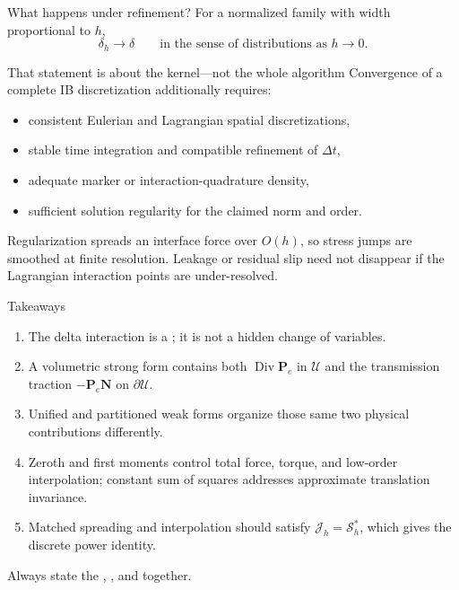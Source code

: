 \documentclass[aspectratio=169,11pt]{beamer}
\newcommand{\Pten}{\bm{P}_{e}}
\newcommand{\Nvec}{\bm{N}}
\begin{document}
\begin{frame}{What happens under refinement?}
For a normalized family with width proportional to \(h\),
\[
  \delta_h\longrightarrow\delta
  \qquad\text{in the sense of distributions as }h\to0.
\]

\begin{block}{That statement is about the kernel---not the whole algorithm}
Convergence of a complete IB discretization additionally requires:
\begin{itemize}
  \item consistent Eulerian and Lagrangian spatial discretizations,
  \item stable time integration and compatible refinement of \(\Delta t\),
  \item adequate marker or interaction-quadrature density,
  \item sufficient solution regularity for the claimed norm and order.
\end{itemize}
\end{block}

\begin{punchbox}
Regularization spreads an interface force over \(O(h)\), so stress jumps are smoothed at finite resolution. Leakage or residual slip need not disappear if the Lagrangian interaction points are under-resolved.
\end{punchbox}
\end{frame}

\begin{frame}{Takeaways}
\begin{enumerate}
  \item The delta interaction is a ; it is not a hidden change of variables.
  \item A volumetric strong form contains both \(\operatorname{Div}\Pten\) in \(\mathcal U\) and the transmission traction \(-\Pten\Nvec\) on \(\partial\mathcal U\).
  \item Unified and partitioned weak forms organize those same two physical contributions differently.
  \item Zeroth and first moments control total force, torque, and low-order interpolation; constant sum of squares addresses approximate translation invariance.
  \item Matched spreading and interpolation should satisfy \(\mathcal J_h=\mathcal S_h^*\), which gives the discrete power identity.
\end{enumerate}

\begin{punchbox}
\centering
Always state the , , and  together.
\end{punchbox}
\end{frame}
\end{document}
